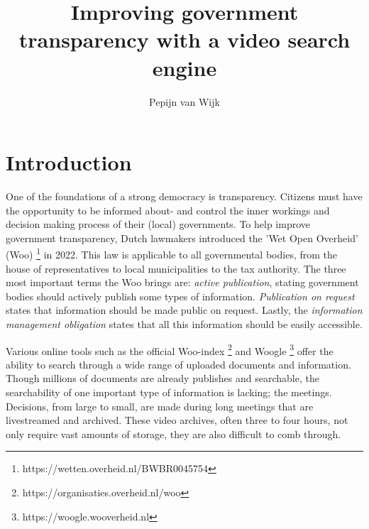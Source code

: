\documentclass[twoside]{uva-inf-bachelor-thesis}
\title{Improving government transparency with a video search engine}
\author{Pepijn van Wijk}
\begin{document}
\maketitle

\begin{abstract}
\lipsum[2]
\end{abstract}

\tableofcontents

\chapter{Introduction}
One of the foundations of a strong democracy is transparency. Citizens must have the opportunity to be informed about- and control the inner workings and decision making process of their (local) governments. To help improve government transparency, Dutch lawmakers introduced the 'Wet Open Overheid' (Woo) \footnote{https://wetten.overheid.nl/BWBR0045754} in 2022. 
This law is applicable to all governmental bodies, from the house of representatives to local municipalities to the tax authority. The three most important terms the Woo brings are: \textit{active publication}, stating government bodies should actively publish some types of information. \textit{Publication on request} states that information should be made public on request. Lastly, the \textit{information management obligation} states that all this information should be easily accessible. 

Various online tools such as the official Woo-index \footnote{https://organisaties.overheid.nl/woo} and Woogle \footnote{https://woogle.wooverheid.nl} offer the ability to search through a wide range of uploaded documents and information. 
Though millions of documents are already publishes and searchable, the searchability of one important type of information is lacking; the meetings. Decisions, from large to small, are made during long meetings that are livestreamed and archived. These video archives, often three to four hours, not only require vast amounts of storage, they are also difficult to comb through. 
\end{document}
